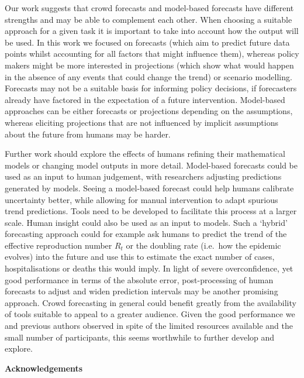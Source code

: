 \documentclass[
]{article}
\begin{document}
Our work suggests that crowd forecasts and model-based forecasts have different strengths and may be able to complement each other. When choosing a suitable approach for a given task it is important to take into account how the output will be used. In this work we focused on forecasts (which aim to predict future data points whilst accounting for all factors that might influence them), whereas policy makers might be more interested in projections (which show what would happen in the absence of any events that could change the trend) or scenario modelling. Forecasts may not be a suitable basis for informing policy decisions, if forecasters already have factored in the expectation of a future intervention. Model-based approaches can be either forecasts or projections depending on the assumptions, whereas eliciting projections that are not influenced by implicit assumptions about the future from humans may be harder.

Further work should explore the effects of humans refining their mathematical models or changing model outputs in more detail. Model-based forecasts could be used as an input to human judgement, with researchers adjusting predictions generated by models. Seeing a model-based forecast could help humans calibrate uncertainty better, while allowing for manual intervention to adapt spurious trend predictions. Tools need to be developed to facilitate this process at a larger scale. Human insight could also be used as an input to models. Such a `hybrid' forecasting approach could for example ask humans to predict the trend of the effective reproduction number \(R_t\) or the doubling rate (i.e.~how the epidemic evolves) into the future and use this to estimate the exact number of cases, hospitalisations or deaths this would imply. In light of severe overconfidence, yet good performance in terms of the absolute error, post-processing of human forecasts to adjust and widen prediction intervals may be another promising approach. Crowd forecasting in general could benefit greatly from the availability of tools suitable to appeal to a greater audience. Given the good performance we and previous authors observed in spite of the limited resources available and the small number of participants, this seems worthwhile to further develop and explore.

\clearpage

\textbf{Acknowledgements}
\end{document}
